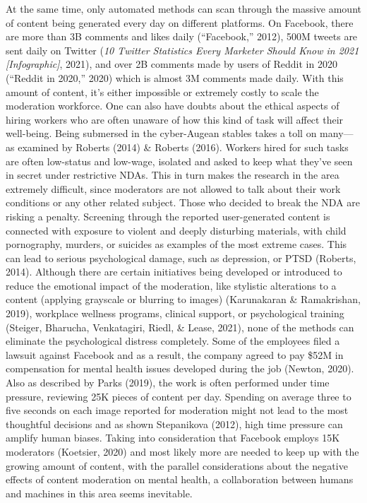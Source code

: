 \documentclass[
  10pt,
  dvipsnames,enabledeprecatedfontcommands]{scrartcl}
\begin{document}
At the same time, only automated methods can scan through the massive
amount of content being generated every day on different platforms. On
Facebook, there are more than 3B comments and likes daily
({``Facebook,''} 2012), 500M tweets are sent daily on Twitter (\emph{10
{Twitter} {Statistics} {Every} {Marketer} {Should} {Know} in 2021
{[}{Infographic}{]}}, 2021), and over 2B comments made by users of
Reddit in 2020 ({``Reddit in 2020,''} 2020) which is almost 3M comments
made daily. With this amount of content, it's either impossible or
extremely costly to scale the moderation workforce. One can also have
doubts about the ethical aspects of hiring workers who are often unaware
of how this kind of task will affect their well-being. Being submersed
in the cyber-Augean stables takes a toll on many---as examined by
Roberts (2014) \& Roberts (2016). Workers hired for such tasks are often
low-status and low-wage, isolated and asked to keep what they've seen in
secret under restrictive NDAs. This in turn makes the research in the
area extremely difficult, since moderators are not allowed to talk about
their work conditions or any other related subject. Those who decided to
break the NDA are risking a penalty. Screening through the reported
user-generated content is connected with exposure to violent and deeply
disturbing materials, with child pornography, murders, or suicides as
examples of the most extreme cases. This can lead to serious
psychological damage, such as depression, or PTSD (Roberts, 2014).
Although there are certain initiatives being developed or introduced to
reduce the emotional impact of the moderation, like stylistic
alterations to a content (applying grayscale or blurring to images)
(Karunakaran \& Ramakrishan, 2019), workplace wellness programs,
clinical support, or psychological training (Steiger, Bharucha,
Venkatagiri, Riedl, \& Lease, 2021), none of the methods can eliminate
the psychological distress completely. Some of the employees filed a
lawsuit against Facebook and as a result, the company agreed to pay
\$52M in compensation for mental health issues developed during the job
(Newton, 2020). Also as described by Parks (2019), the work is often
performed under time pressure, reviewing 25K pieces of content per day.
Spending on average three to five seconds on each image reported for
moderation might not lead to the most thoughtful decisions and as shown
Stepanikova (2012), high time pressure can amplify human biases. Taking
into consideration that Facebook employs 15K moderators (Koetsier, 2020)
and most likely more are needed to keep up with the growing amount of
content, with the parallel considerations about the negative effects of
content moderation on mental health, a collaboration between humans and
machines in this area seems inevitable.
\end{document}
